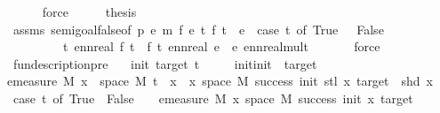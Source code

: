 \begin{isabellebody}
\ \ \ \ \isamarkupfalse%
\ force\isanewline
\ \ \isamarkupfalse%
\ \isamarkupfalse%
\ {\isacharquery}{\kern0pt}thesis\isanewline
\ \ \ \ \isamarkupfalse%
\ assms\ semi{\isacharunderscore}{\kern0pt}goal{}{\isacharunderscore}{\kern0pt}false{\isacharbrackleft}{\kern0pt}of\ p{}\ e{}\ m\ f{}{\isacharbrackright}{\kern0pt}\ {\isacartoucheopen}e{}{\isasymge}{}{\isacartoucheclose}\ {\isacartoucheopen}{\isasymAnd}t{\isachardot}{\kern0pt}\ f{}\ t\ {\isacharequal}{\kern0pt}\ e{}\ {\isacharasterisk}{\kern0pt}\ {\isacharparenleft}{\kern0pt}case\ t\ of\ True\ {\isasymRightarrow}\ {}{\isacharbar}{\kern0pt}\ False\ {\isasymRightarrow}\ {}{\isacharparenright}{\kern0pt}{\isacartoucheclose}\isanewline
\ \ \ \ \ \ \ \ \ {\isacartoucheopen}{\isasymAnd}t{\isachardot}{\kern0pt}\ ennreal\ {\isacharparenleft}{\kern0pt}f{}\ t{\isacharparenright}{\kern0pt}\ {\isacharequal}{\kern0pt}\ f\ t{\isacartoucheclose}\ {\isacartoucheopen}ennreal\ e{}\ {\isacharequal}{\kern0pt}\ e{\isacartoucheclose}\ ennreal{\isacharunderscore}{\kern0pt}mult{\isacharprime}{\kern0pt}{\isacharprime}{\kern0pt}\ \isanewline
\ \ \ \ \isamarkupfalse%
\ force\isanewline
{}\isamarkupfalse%
%
\endisatagproof
{\isafoldproof}%
%
\isadelimproof
\isanewline
%
\endisadelimproof
\isanewline
\isanewline
\isanewline
{}\isamarkupfalse%
\ fun{\isacharunderscore}{\kern0pt}description{\isacharunderscore}{\kern0pt}pre{\isacharcolon}{\kern0pt}\isanewline
\ \ \ init\ target\ t\isanewline
\ \ \ {\isachardoublequoteopen}{}\ {\isacharless}{\kern0pt}\ init{\isachardoublequoteclose}{\isachardoublequoteopen}init\ {\isacharless}{\kern0pt}\ target{\isachardoublequoteclose}\isanewline
\ \ \isanewline
{\isachardoublequoteopen}emeasure\ M\ {\isacharbraceleft}{\kern0pt}x\ {\isasymin}\ space\ M{\isachardot}{\kern0pt}\ t\ {\isacharhash}{\kern0pt}{\isacharhash}{\kern0pt}\ x\ {\isasymin}\ {\isacharbraceleft}{\kern0pt}x{\isasymin}\ space\ M{\isachardot}{\kern0pt}\ success\ {\isacharparenleft}{\kern0pt}init{\isacharplus}{\kern0pt}{}{\isacharparenright}{\kern0pt}\ {\isacharparenleft}{\kern0pt}stl\ x{\isacharparenright}{\kern0pt}\ target\ {\isasymand}\ shd\ x{\isacharbraceright}{\kern0pt}{\isacharbraceright}{\kern0pt}\ \isanewline
{\isacharequal}{\kern0pt}\ {\isacharparenleft}{\kern0pt}case\ t\ of\ True\ {\isasymRightarrow}\ {}{\isacharbar}{\kern0pt}False\ {\isasymRightarrow}\ {}{\isacharparenright}{\kern0pt}\ {\isacharasterisk}{\kern0pt}\ {\isacharparenleft}{\kern0pt}emeasure\ M\ {\isacharbraceleft}{\kern0pt}x{\isasymin}\ space\ M{\isachardot}{\kern0pt}\ success\ {\isacharparenleft}{\kern0pt}init{\isacharplus}{\kern0pt}{}{\isacharparenright}{\kern0pt}\ {\isacharparenleft}{\kern0pt}x{\isacharparenright}{\kern0pt}\ target{\isacharbraceright}{\kern0pt}{\isacharparenright}{\kern0pt}{\isachardoublequoteclose}\isanewline

\end{isabellebody}
